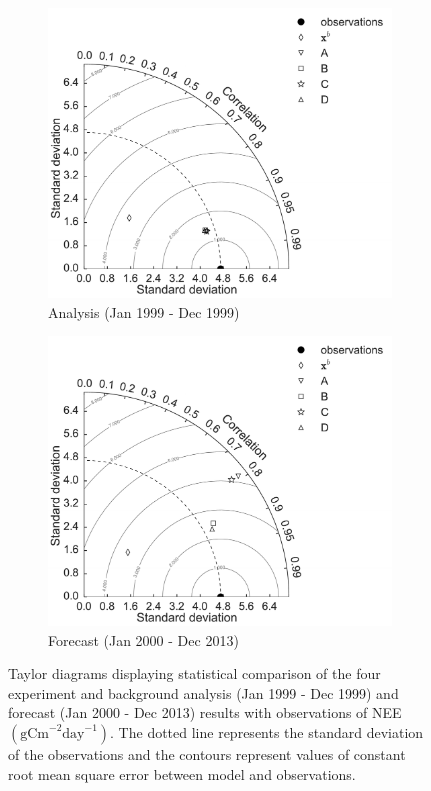 \begin{figure}[ht]
    \centering
    \begin{subfigure}[b]{0.49\textwidth}
        \includegraphics[width=\textwidth]{chapter/chapter6/td.pdf}
        \caption{Analysis (Jan 1999 - Dec 1999)}
        \label{chap6:fig:td_a}
    \end{subfigure}
    \begin{subfigure}[b]{0.49\textwidth}
        \includegraphics[width=\textwidth]{chapter/chapter6/tdf.pdf}
        \caption{Forecast (Jan 2000 - Dec 2013)}
        \label{chap6:fig:td_f}
    \end{subfigure}
    \caption{Taylor diagrams displaying statistical comparison of the four experiment and background analysis (Jan 1999 - Dec 1999) and forecast (Jan 2000 - Dec 2013) results with observations of NEE $( \text{gCm}^{-2}\text{day}^{-1})$. The dotted line represents the standard deviation of the observations and the contours represent values of constant root mean square error between model and observations.}
    \label{chap6:fig:taylordiag}
\end{figure}

